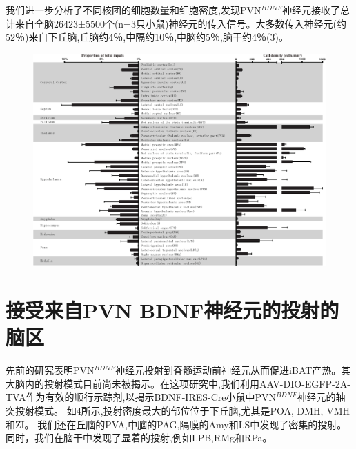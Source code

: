 我们进一步分析了不同核团的细胞数量和细胞密度,发现PVN$^{BDNF}$神经元接收了总计来自全脑26423±5500个(n=3只小鼠)神经元的传入信号。大多数传入神经元(约52％)来自下丘脑,丘脑约4％,中隔约10％,中脑约5％,脑干约4％(\figurename{3})。

\begin{figure}[!htbp]
    \centering
    \includegraphics[trim = 0mm 0mm 0mm 0mm, clip, width=\textwidth]{Img/figure3.pdf}
    \label{fig:figure3}
\end{figure}

\section{接受来自PVN BDNF神经元的投射的脑区}
先前的研究表明PVN$^{BDNF}$神经元投射到脊髓运动前神经元从而促进iBAT产热\citep{an2015discrete}。其大脑内的投射模式目前尚未被揭示。在这项研究中,我们利用AAV-DIO-EGFP-2A-TVA作为有效的顺行示踪剂,以揭示BDNF-IRES-Cre小鼠中PVN$^{BDNF}$神经元的轴突投射模式。 如\figurename{4}所示,投射密度最大的部位位于下丘脑,尤其是POA, DMH, VMH和ZI。 我们还在丘脑的PVA,中脑的PAG,隔膜的Amy和LS中发现了密集的投射。同时，我们在脑干中发现了显着的投射,例如LPB,RMg和RPa。

